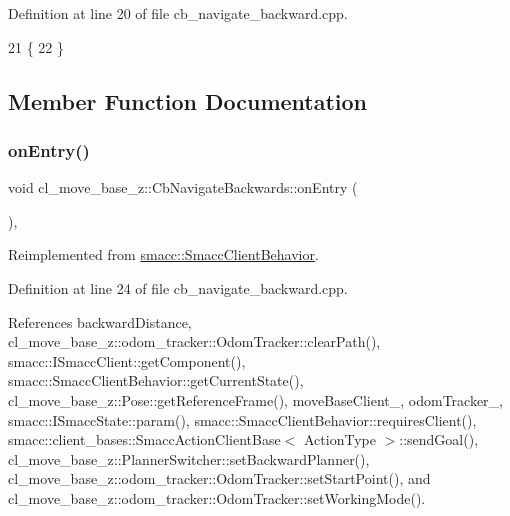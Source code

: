 Definition at line 20 of file cb\+\_\+navigate\+\_\+backward.\+cpp.


\begin{DoxyCode}
21 \{
22 \}
\end{DoxyCode}


\subsection{Member Function Documentation}
\mbox{\label{classcl__move__base__z_1_1CbNavigateBackwards_a545a5282f0ef6b0080b46002d6037567}} 
\subsubsection{\texorpdfstring{on\+Entry()}{onEntry()}}
{\footnotesize\ttfamily void cl\+\_\+move\+\_\+base\+\_\+z\+::\+Cb\+Navigate\+Backwards\+::on\+Entry (\begin{DoxyParamCaption}{ }\end{DoxyParamCaption})\hspace{0.3cm}{\ttfamily [override]}, {\ttfamily [virtual]}}



Reimplemented from \hyperlink{classsmacc_1_1SmaccClientBehavior_a7962382f93987c720ad432fef55b123f}{smacc\+::\+Smacc\+Client\+Behavior}.



Definition at line 24 of file cb\+\_\+navigate\+\_\+backward.\+cpp.



References backward\+Distance, cl\+\_\+move\+\_\+base\+\_\+z\+::odom\+\_\+tracker\+::\+Odom\+Tracker\+::clear\+Path(), smacc\+::\+I\+Smacc\+Client\+::get\+Component(), smacc\+::\+Smacc\+Client\+Behavior\+::get\+Current\+State(), cl\+\_\+move\+\_\+base\+\_\+z\+::\+Pose\+::get\+Reference\+Frame(), move\+Base\+Client\+\_\+, odom\+Tracker\+\_\+, smacc\+::\+I\+Smacc\+State\+::param(), smacc\+::\+Smacc\+Client\+Behavior\+::requires\+Client(), smacc\+::client\+\_\+bases\+::\+Smacc\+Action\+Client\+Base$<$ Action\+Type $>$\+::send\+Goal(), cl\+\_\+move\+\_\+base\+\_\+z\+::\+Planner\+Switcher\+::set\+Backward\+Planner(), cl\+\_\+move\+\_\+base\+\_\+z\+::odom\+\_\+tracker\+::\+Odom\+Tracker\+::set\+Start\+Point(), and cl\+\_\+move\+\_\+base\+\_\+z\+::odom\+\_\+tracker\+::\+Odom\+Tracker\+::set\+Working\+Mode().


